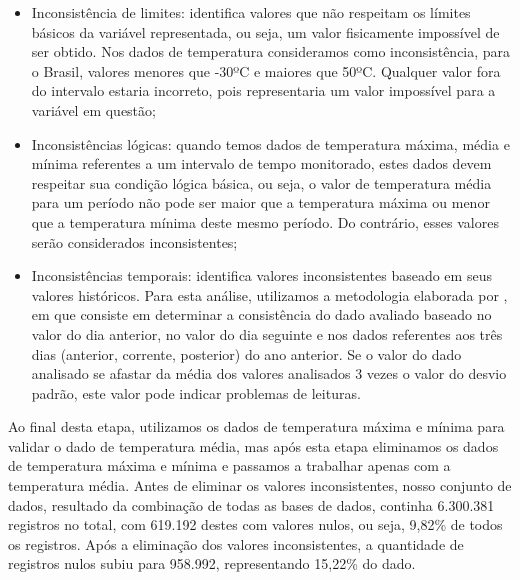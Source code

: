 \begin{itemize}
	\item Inconsistência de limites: identifica valores que não respeitam os límites básicos da variável representada, ou seja, um valor fisicamente impossível de ser obtido. Nos dados de temperatura consideramos como inconsistência, para o Brasil, valores menores que -30ºC e maiores que 50ºC. Qualquer valor fora do intervalo estaria incorreto, pois representaria um valor impossível para a variável em questão;
	
	\item Inconsistências lógicas: quando temos dados de temperatura máxima, média e mínima referentes a um intervalo de tempo monitorado, estes dados devem respeitar sua condição lógica básica, ou seja, o valor de temperatura média para um período não pode ser maior que a temperatura máxima ou menor que a temperatura mínima deste mesmo período. Do contrário, esses valores serão considerados inconsistentes;     
	\item Inconsistências temporais: identifica valores inconsistentes baseado em seus valores históricos. Para esta análise, utilizamos a metodologia elaborada por \cite{mateo2008design}, em que consiste em determinar a consistência do dado avaliado baseado no valor do dia anterior, no valor do dia  seguinte e nos dados referentes aos três dias (anterior, corrente, posterior) do ano anterior. Se o valor do dado analisado se afastar da média dos valores analisados 3 vezes o valor do desvio padrão, este valor pode indicar problemas de leituras.  
\end{itemize}

Ao final desta etapa, utilizamos os dados de temperatura máxima e mínima para validar o dado de temperatura média, mas após esta etapa eliminamos os dados de temperatura máxima e mínima e passamos a trabalhar apenas com a temperatura média. Antes de eliminar os valores inconsistentes, nosso conjunto de dados, resultado da combinação de todas as bases de dados, continha 6.300.381 registros no total, com 619.192 destes com valores nulos, ou seja, 9,82\% de todos os registros. Após a eliminação dos valores inconsistentes, a quantidade de registros nulos subiu para 958.992, representando 15,22\% do dado. 

\renewcommand{\cleardoublepage}{}
\renewcommand{\clearpage}{}
\vspace{5mm}